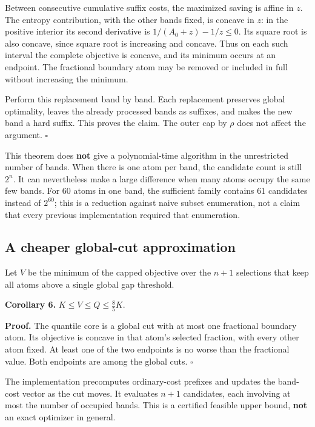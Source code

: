 \documentclass[
  11pt,
  a4paper,
]{article}
\begin{document}
Between consecutive cumulative suffix costs, the maximized saving is
affine in \(z\). The entropy contribution, with the other bands fixed,
is concave in \(z\): in the positive interior its second derivative is
\(1/(A_0+z)-1/z\le0\). Its square root is also concave, since square
root is increasing and concave. Thus on each such interval the complete
objective is concave, and its minimum occurs at an endpoint. The
fractional boundary atom may be removed or included in full without
increasing the minimum.

Perform this replacement band by band. Each replacement preserves global
optimality, leaves the already processed bands as suffixes, and makes
the new band a hard suffix. This proves the claim. The outer cap by
\(\rho\) does not affect the argument. \(\square\)

This theorem does \textbf{not} give a polynomial-time algorithm in the
unrestricted number of bands. When there is one atom per band, the
candidate count is still \(2^n\). It can nevertheless make a large
difference when many atoms occupy the same few bands. For 60 atoms in
one band, the sufficient family contains 61 candidates instead of
\(2^{60}\); this is a reduction against naive subset enumeration, not a
claim that every previous implementation required that enumeration.

\subsection{A cheaper global-cut
approximation}\label{a-cheaper-global-cut-approximation}

Let \(V\) be the minimum of the capped objective over the \(n+1\)
selections that keep all atoms above a single global gap threshold.

\textbf{Corollary 6.} \(K\le V\le Q\le\tfrac85K\).

\textbf{Proof.} The quantile core is a global cut with at most one
fractional boundary atom. Its objective is concave in that atom's
selected fraction, with every other atom fixed. At least one of the two
endpoints is no worse than the fractional value. Both endpoints are
among the global cuts. \(\square\)

The implementation precomputes ordinary-cost prefixes and updates the
band-cost vector as the cut moves. It evaluates \(n+1\) candidates, each
involving at most the number of occupied bands. This is a certified
feasible upper bound, \textbf{not} an exact optimizer in general.
\end{document}
